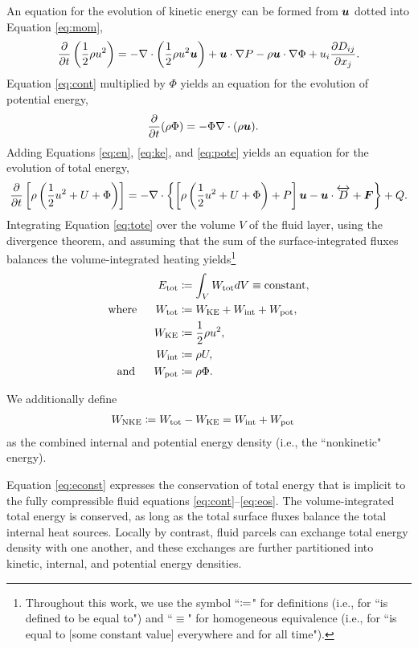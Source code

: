 \documentclass[12pt]{article}
\newcommand{\vecf}{\bm{F}}
\newcommand{\etot}{E_{\rm tot}}
\newcommand{\wtot}{W_{\rm tot}}
\newcommand{\wke}{W_{\rm KE}}
\newcommand{\wnke}{W_{\rm NKE}}
\newcommand{\wint}{W_{\rm int}}
\newcommand{\wpot}{W_{\rm pot}}
\begin{document}
	An equation for the evolution of kinetic energy can be formed from $\bm{u}$ dotted into Equation \eqref{eq:mom},
	\begin{align}\label{eq:ke}
		\frac{\partial}{\partial t}\left(\frac{1}{2}\rho u^2\right) = - \nabla\cdot\left(\frac{1}{2}\rho u^2\bm{u} \right) + \bm{u}\cdot\nabla P - \rho\bm{u}\cdot\nabla\Phi+ u_i\frac{\partial D_{ij}}{\partial x_j}.
	\end{align}
	Equation \eqref{eq:cont} multiplied by $\Phi$ yields an equation for the evolution of potential energy,
	\begin{align}\label{eq:pote}
		\frac{\partial}{\partial t}(\rho\Phi) &= - \Phi \nabla\cdot(\rho\bm{u}).
	\end{align}
	Adding Equations \eqref{eq:en}, \eqref{eq:ke}, and \eqref{eq:pote} yields an equation for the evolution of total energy,
	\begin{align}\label{eq:tote}
		\pderiv{}{t}\left[\rho\left(\frac{1}{2} u^2 + U + \Phi\right)\right] = -\Div\left\{\left[\rho\left(\frac{1}{2} u^2 + U + \Phi\right) + P\right]\vecu- \vecu\cdot\overleftrightarrow{D} + \vecf\right\} + Q.
	\end{align}
	Integrating Equation \eqref{eq:tote} over the volume $V$ of the fluid layer, using the divergence theorem, and assuming that the sum of the surface-integrated fluxes balances the volume-integrated heating yields\footnote{Throughout this work, we use the symbol ``$\coloneqq$" for definitions (i.e., for ``is defined to be equal to") and ``$\equiv$" for homogeneous equivalence (i.e., for ``is equal to [some constant value] everywhere and for all time").}
	\begin{subequations}\label{eq:econst}
	\begin{align}
		\etot &\define \int_V \wtot dV \equiv \text{constant},\\
		\where \wtot &\define \wke + \wint + \wpot,\label{eq:wtot}\\
		\wke &\define \frac{1}{2}\rho u^2,\\
		\wint &\define \rho U,\\
		\andd \wpot &\define \rho \Phi. 
	\end{align}
	\end{subequations}
	
	We additionally define
	\begin{align}\label{eq:wnke}
		\wnke &\define \wtot - \wke = \wint + \wpot 
	\end{align}
	as the combined internal and potential energy density (i.e., the ``nonkinetic" energy). 
	
	Equation \eqref{eq:econst} expresses the conservation of total energy that is implicit to the fully compressible fluid equations \eqref{eq:cont}--\eqref{eq:eos}. The volume-integrated total energy is conserved, as long as the total surface fluxes balance the total internal heat sources. Locally by contrast, fluid parcels can exchange total energy density with one another, and these exchanges are further partitioned into kinetic, internal, and potential energy densities. 
	
\end{document}
